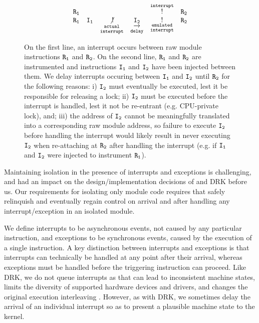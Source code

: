 \documentclass[10pt,preprint]{sigplanconf}
\begin{document}
\begin{figure}
\[
\begin{matrix}
\tt{R_1} & & & & \tt{\overset{interrupt}!} & \tt{R_2}\\
\tt{R_1} & \tt{I_1} & \tt{\underset{interrupt}{\underset{actual}{\not{!}}}} & \tt{\underset{delay}{\underset{\xrightarrow[]{}}{I_2}}} & \tt{\underset{interrupt}{\underset{emulated}!}} & \tt{R_2}
\end{matrix}
\]
\caption{%
On the first line, an interrupt occurs between raw module instructions $\tt{R_1}$ and $\tt{R_2}$. On the second line, $\tt{R_1}$ and $\tt{R_2}$ are instrumented and instructions $\tt{I_1}$ and $\tt{I_2}$ have been injected between them. We delay interrupts occuring between $\tt{I_1}$ and $\tt{I_2}$ until $\tt{R_2}$ for the following reasons: i) $\tt{I_2}$ must eventually be executed, lest it be responsible for releasing a lock; ii) $\tt{I_2}$ must be executed before the interrupt is handled, lest it not be re-entrant (e.g. CPU-private lock), and; iii) the address of $\tt{I_2}$ cannot be meaningfully translated into a corresponding raw module address, so failure to execute $\tt{I_2}$ before handling the interrupt would likely result in never executing $\tt{I_2}$ when re-attaching {\sysname} at $\tt{R_2}$ after handling the interrupt (e.g. if $\tt{I_1}$ and $\tt{I_2}$ were injected to instrument $\tt{R_1}$).}
\label{fig:interrupt_delay}
\end{figure}

Maintaining isolation in the presence of interrupts and exceptions is challenging, and had an impact on the design/implementation decisions of {\sysname} and DRK before us. Our requirements for isolating only module code requires that {\sysname} safely relinquish and eventually regain control on arrival and after handling any interrupt/exception in an isolated module.

We define interrupts to be asynchronous events, not caused by any particular instruction, and exceptions to be synchronous events, caused by the execution of a single instruction. A key distinction between interrupts and exceptions is that interrupts can technically be handled at any point after their arrival, whereas exceptions must be handled before the triggering instruction can proceed. Like DRK, we do not queue interrupts as that can lead to inconsistent machine states, limits the diversity of supported hardware devices and drivers, and changes the original execution interleaving \cite{Feiner2012}. However, as with DRK, we sometimes delay the arrival of an individual interrupt so as to present a plausible machine state to the kernel.
\end{document}
